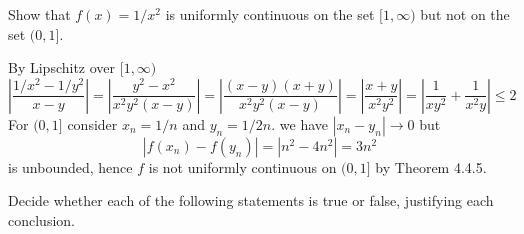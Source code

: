 \begin{exercise}
  Show that $f(x)=1 / x^{2}$ is uniformly continuous on the set $[1, \infty)$ but not on the set $(0,1]$.
\end{exercise}

\begin{solution}
  By Lipschitz over $[1, \infty)$
  $$
  \left|\frac{1/x^2 - 1/y^2}{x - y}\right|
  = \left|\frac{y^2 - x^2}{x^2y^2(x-y)}\right|
  = \left|\frac{(x - y)(x + y)}{x^2y^2(x-y)}\right|
  = \left|\frac{x + y}{x^2y^2}\right|
  = \left|\frac{1}{xy^2} + \frac{1}{x^2y}\right|
  \le 2
  $$
  For $(0, 1]$ consider $x_n = 1/n$ and $y_n = 1/2n$. we have $|x_n - y_n| \to 0$ but
  $$|f(x_n) - f(y_n)| = |n^2 - 4n^2| = 3n^2$$
  is unbounded, hence $f$ is not uniformly continuous on $(0, 1]$ by Theorem 4.4.5.
\end{solution}

\begin{exercise}
  Decide whether each of the following statements is true or false, justifying each conclusion.
\end{exercise}

